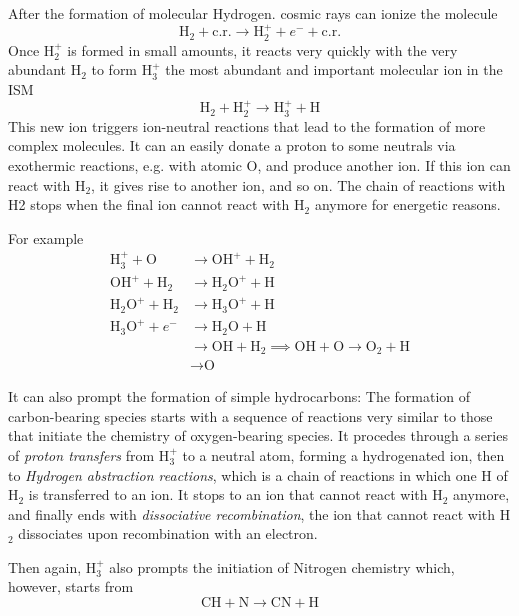 After the formation of molecular Hydrogen. cosmic rays can ionize the molecule 
\begin{equation*}
    \text{H}_{2} + \text{c.r.} \to \text{H}_{2}^{+} + e^{-}+\text{c.r.}
\end{equation*}
Once $\text{H}_{2}^{+}$ is formed in small amounts, it reacts very quickly with the very abundant H$_{2}$ to form H$_{3}^{+}$ the most abundant and important molecular ion in the ISM
\begin{equation*}
    \text{H}_{2} + \text{H}_{2}^{+} \to \text{H}_{3}^{+} +\text{H}
\end{equation*}
This new ion triggers ion-neutral reactions that lead to the formation of more complex molecules. It can an easily donate a proton to some neutrals via exothermic reactions, e.g. with atomic O, and
produce another ion. If this ion can react with H$_{2}$, it gives
rise to another ion, and so on. The chain of reactions with H2 stops when the final ion cannot react with H$_{2}$ anymore for energetic reasons.
\par For example
\begin{align*}
    \text{H}_{3}^{+} + \text{O} &\to \text{OH}^{+} + \text{H}_{2}\\
    \text{OH}^{+} + \text{H}_{2} &\to \text{H}_{2}\text{O}^{+} + \text{H}\\
    \text{H}_{2}\text{O}^{+} + \text{H}_{2} &\to \text{H}_{3}\text{O}^{+} + \text{H}\\
    \text{H}_{3}\text{O}^{+} + e^{-} &\to \text{H}_{2}\text{O} + \text{H}\\
    &\to \text{OH} +\text{H}_{2} \implies \text{OH} + \text{O} \to \text{O}_{2} + \text{H} \\
    &\to \text{O}
\end{align*}
\par It can also prompt the formation of simple hydrocarbons: The formation of carbon-bearing species starts with a sequence of reactions very similar to those that initiate the chemistry of oxygen-bearing species. It procedes through a series of \emph{proton transfers} from H$_{3}^{+}$ to a neutral atom, forming a hydrogenated ion, then to \emph{Hydrogen abstraction reactions}, which is a chain of reactions in which one H of H$_{2}$ is transferred to an ion. It stops to an ion that cannot react with H$_{2}$ anymore, and finally ends with \emph{dissociative recombination}, the ion that cannot react with H$_{2}$ dissociates upon recombination with an electron.
\par Then again, H$_{3}^{+}$ also prompts the initiation of Nitrogen chemistry which, however, starts from 
\begin{equation*}
    \text{CH} + \text{N} \to \text{CN} + \text{H}
\end{equation*}

